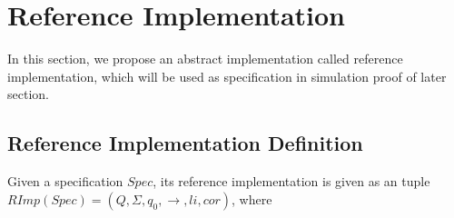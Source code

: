 
\section{Reference Implementation}
\label{sec:reference implementation}

In this section, we propose an abstract implementation called reference implementation, which will be used as specification in simulation proof of later section.


\subsection{Reference Implementation Definition}
\label{subsec:reference implementation definition}

Given a specification $Spec$, its reference implementation is given as an tuple $RImp(Spec) = (Q,\Sigma,q_0,\rightarrow,li,cor)$, where

